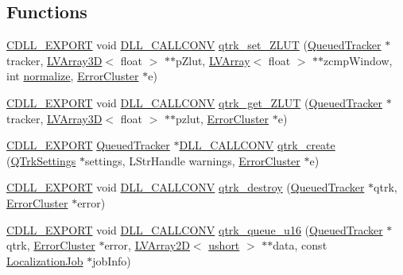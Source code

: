 \subsection*{Functions}
\begin{DoxyCompactItemize}
\item 
\hyperlink{dllmacros_8h_af97e4004759ff877db017c3d1a855482}{C\+D\+L\+L\+\_\+\+E\+X\+P\+O\+RT} void \hyperlink{dllmacros_8h_a6596c37c55424b395798708344d63791}{D\+L\+L\+\_\+\+C\+A\+L\+L\+C\+O\+NV} \hyperlink{group__lab___a_p_i_gaf67d827ac63ac46740e2cbed37d7bb69}{qtrk\+\_\+set\+\_\+\+Z\+L\+UT} (\hyperlink{class_queued_tracker}{Queued\+Tracker} $\ast$tracker, \hyperlink{struct_l_v_array3_d}{L\+V\+Array3D}$<$ float $>$ $\ast$$\ast$p\+Zlut, \hyperlink{struct_l_v_array}{L\+V\+Array}$<$ float $>$ $\ast$$\ast$zcmp\+Window, int \hyperlink{utils_8h_a32b5810b69072511c66006593bcf7a89}{normalize}, \hyperlink{struct_error_cluster}{Error\+Cluster} $\ast$e)
\item 
\hyperlink{dllmacros_8h_af97e4004759ff877db017c3d1a855482}{C\+D\+L\+L\+\_\+\+E\+X\+P\+O\+RT} void \hyperlink{dllmacros_8h_a6596c37c55424b395798708344d63791}{D\+L\+L\+\_\+\+C\+A\+L\+L\+C\+O\+NV} \hyperlink{group__lab___a_p_i_ga15e02fb27aa032ceb0e386ae2402a3aa}{qtrk\+\_\+get\+\_\+\+Z\+L\+UT} (\hyperlink{class_queued_tracker}{Queued\+Tracker} $\ast$tracker, \hyperlink{struct_l_v_array3_d}{L\+V\+Array3D}$<$ float $>$ $\ast$$\ast$pzlut, \hyperlink{struct_error_cluster}{Error\+Cluster} $\ast$e)
\item 
\hyperlink{dllmacros_8h_af97e4004759ff877db017c3d1a855482}{C\+D\+L\+L\+\_\+\+E\+X\+P\+O\+RT} \hyperlink{class_queued_tracker}{Queued\+Tracker} $\ast$\hyperlink{dllmacros_8h_a6596c37c55424b395798708344d63791}{D\+L\+L\+\_\+\+C\+A\+L\+L\+C\+O\+NV} \hyperlink{group__lab___a_p_i_gad40c61b77b7ed8e6f3f03b715b2f5fbc}{qtrk\+\_\+create} (\hyperlink{struct_q_trk_settings}{Q\+Trk\+Settings} $\ast$settings, L\+Str\+Handle warnings, \hyperlink{struct_error_cluster}{Error\+Cluster} $\ast$e)
\item 
\hyperlink{dllmacros_8h_af97e4004759ff877db017c3d1a855482}{C\+D\+L\+L\+\_\+\+E\+X\+P\+O\+RT} void \hyperlink{dllmacros_8h_a6596c37c55424b395798708344d63791}{D\+L\+L\+\_\+\+C\+A\+L\+L\+C\+O\+NV} \hyperlink{group__lab___a_p_i_ga8b91b4749a009f7ebee0ead0090fbcc7}{qtrk\+\_\+destroy} (\hyperlink{class_queued_tracker}{Queued\+Tracker} $\ast$qtrk, \hyperlink{struct_error_cluster}{Error\+Cluster} $\ast$error)
\item 
\hyperlink{dllmacros_8h_af97e4004759ff877db017c3d1a855482}{C\+D\+L\+L\+\_\+\+E\+X\+P\+O\+RT} void \hyperlink{dllmacros_8h_a6596c37c55424b395798708344d63791}{D\+L\+L\+\_\+\+C\+A\+L\+L\+C\+O\+NV} \hyperlink{group__lab___a_p_i_ga220bb182b5da1bbaaef08f305102279f}{qtrk\+\_\+queue\+\_\+u16} (\hyperlink{class_queued_tracker}{Queued\+Tracker} $\ast$qtrk, \hyperlink{struct_error_cluster}{Error\+Cluster} $\ast$error, \hyperlink{struct_l_v_array2_d}{L\+V\+Array2D}$<$ \hyperlink{std__incl_8h_ab95f123a6c9bcfee6a343170ef8c5f69}{ushort} $>$ $\ast$$\ast$data, const \hyperlink{struct_localization_job}{Localization\+Job} $\ast$job\+Info)

\end{DoxyCompactItemize}
